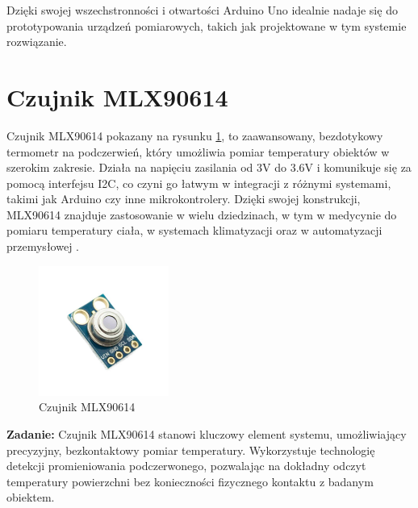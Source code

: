 \newpage

Dzięki swojej wszechstronności i otwartości Arduino Uno idealnie nadaje się do prototypowania urządzeń pomiarowych, takich jak projektowane w tym systemie rozwiązanie.


\vspace{12pt}

\section{Czujnik MLX90614}

    Czujnik MLX90614 pokazany na rysunku \ref{fig:mlx}, to zaawansowany, bezdotykowy termometr na podczerwień, który umożliwia pomiar temperatury obiektów w szerokim zakresie. Działa na napięciu zasilania od 3V do 3.6V i komunikuje się za pomocą interfejsu I2C, co czyni go łatwym w integracji z różnymi systemami, takimi jak Arduino czy inne mikrokontrolery. Dzięki swojej konstrukcji, MLX90614 znajduje zastosowanie w wielu dziedzinach, w tym w medycynie do pomiaru temperatury ciała, w systemach klimatyzacji oraz w automatyzacji przemysłowej \cite{6}.

    \begin{figure}[h!]
        \centering
        \includegraphics[width=0.38\textwidth]{images/mlx.jpg}
        \caption{Czujnik MLX90614 \cite{6}}
        \label{fig:mlx}
    \end{figure}

\textbf{Zadanie:} Czujnik MLX90614 stanowi kluczowy element systemu, umożliwiający precyzyjny, bezkontaktowy pomiar temperatury. Wykorzystuje technologię detekcji promieniowania podczerwonego, pozwalając na dokładny odczyt temperatury powierzchni bez konieczności fizycznego kontaktu z badanym obiektem.

\vspace{12pt}


\vspace{12pt}

